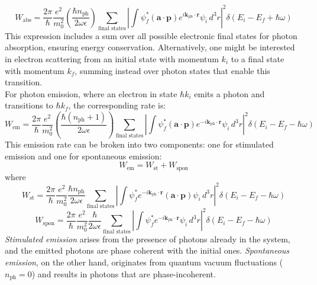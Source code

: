 \begin{equation}
	W_{\text{abs}} = \frac{2\pi}{\hbar} \frac{e^2}{m_0^2} \left( \frac{\hbar n_{\text{ph}}}{2 \omega \epsilon} \right) \sum_{\text{final states}} \left| \int \psi_f^* (\mathbf{a} \cdot \mathbf{p}) e^{i \mathbf{k}_{\text{ph}} \cdot \mathbf{r}} \psi_i \, d^3r \right|^2 \delta(E_i - E_f + \hbar \omega)
\end{equation}
This expression includes a sum over all possible electronic final states for photon absorption, ensuring energy conservation. Alternatively, one might be interested in electron scattering from an initial state with momentum \(k_i\) to a final state with momentum \(k_f\), summing instead over photon states that enable this transition.\\
For photon emission, where an electron in state \(\hbar k_i\) emits a photon and transitions to \(\hbar k_f\), the corresponding rate is:
\begin{equation}
	W_{\text{em}} = \frac{2\pi}{\hbar} \frac{e^2}{m_0^2} \left( \frac{\hbar(n_{\text{ph}} + 1)}{2 \omega \epsilon} \right) \sum_{\text{final states}} \left| \int \psi_f^* (\mathbf{a} \cdot \mathbf{p}) e^{-i \mathbf{k}_{\text{ph}} \cdot \mathbf{r}} \psi_i \, d^3r \right|^2 \delta(E_i - E_f - \hbar \omega)
\end{equation}
This emission rate can be broken into two components: one for stimulated emission and one for spontaneous emission:
\begin{equation}
	W_{\text{em}} = W_{\text{st}} + W_{\text{spon}}
\end{equation}
where
\begin{equation}
	W_{\text{st}} = \frac{2\pi}{\hbar} \frac{e^2}{m_0^2} \frac{\hbar n_{\text{ph}}}{2 \omega \epsilon} \sum_{\text{final states}} \left| \int \psi_f^* e^{-i \mathbf{k}_{\text{ph}} \cdot \mathbf{r}} (\mathbf{a} \cdot \mathbf{p}) \psi_i \, d^3r \right|^2 \delta(E_i - E_f - \hbar \omega)
\end{equation}
\begin{equation}
	W_{\text{spon}} = \frac{2\pi}{\hbar} \frac{e^2}{m_0^2} \frac{\hbar}{2 \omega \epsilon} \sum_{\text{final states}} \left| \int \psi_f^* e^{-i \mathbf{k}_{\text{ph}} \cdot \mathbf{r}} \psi_i \, d^3r \right|^2 \delta(E_i - E_f - \hbar \omega)
\end{equation}
\textit{Stimulated emission} arises from the presence of photons already in the system, and the emitted photons are phase coherent with the initial ones. \textit{Spontaneous emission}, on the other hand, originates from quantum vacuum fluctuations (\(n_{\text{ph}} = 0\)) and results in photons that are phase-incoherent.\\
